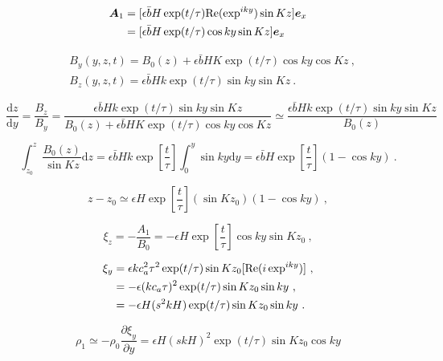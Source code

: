 \documentclass[12pt,a4paper]{article}
\renewcommand{\vec}[1]{\boldsymbol{#1}}
\newcommand{\dif}{\mathrm{d}}
\begin{document}
\begin{align*}
\vec{A}_1 &= [\epsilon \bar{b} H \exp(t/\tau) {\rm Re}(\exp^{iky}) \sin K z] \vec{e}_x \\
&=  [\epsilon \bar{b} H \exp(t/\tau) \cos ky  \sin K z] \vec{e}_x 
\end{align*}

\begin{align*}
& B_y(y, z, t) = B_0(z) +\epsilon \bar{b} H K \exp(t/\tau) \cos ky  \cos K z ~, \\
& B_z(y, z, t) = \epsilon \bar{b} H k \exp(t/\tau) \sin ky  \sin K z ~.
\end{align*}

\begin{equation*}
\frac{\dif z}{\dif y} = \frac{B_z}{B_y} = \frac{\epsilon \bar{b} H k \exp(t/\tau) \sin ky  \sin K z}{B_0(z) +\epsilon \bar{b} H K \exp(t/\tau) \cos ky  \cos K z} \simeq \frac{\epsilon \bar{b} H k \exp(t/\tau) \sin ky  \sin K z}{B_0(z)} 
\end{equation*}

\begin{equation*}
\int_{z_0}^z  \frac{B_0(z)}{\sin Kz} \dif z = \epsilon \bar{b} H k \exp \left[\dfrac{t}{\tau} \right] \int_0^y \sin ky \dif y = \epsilon \bar{b} H \exp \left[\dfrac{t}{\tau}\right] (1 -\cos ky) ~.
\end{equation*}

\begin{equation*}
z- z_0 \simeq \epsilon H \exp \left[\dfrac{t}{\tau} \right] (\sin Kz_0)(1- \cos ky) ~, 
\end{equation*}

\begin{equation*}
\xi_z = -\frac{A_1}{B_0} = -\epsilon H \exp \left[\dfrac{t}{\tau} \right] \cos ky \sin K z_0 ~,
\end{equation*}

\begin{align*}
\xi_y &= \epsilon k c_a^2 \tau^2 \exp(t/\tau) \sin K z_0 [{\rm Re}(i \exp^{iky})] ~, \\
&= -\epsilon (k c_a \tau)^2 \exp(t/\tau) \sin K z_0 \sin ky ~, \\
&= -\epsilon H (s^2 k H)  \exp(t/\tau) \sin K z_0 \sin ky  ~.
\end{align*}

\begin{equation}
\rho_1 \simeq -\rho_0 \frac{\partial \xi_y}{\partial y} = \epsilon H (s k H)^2  \exp(t/\tau) \sin K z_0 \cos ky
\end{equation}
\end{document}
